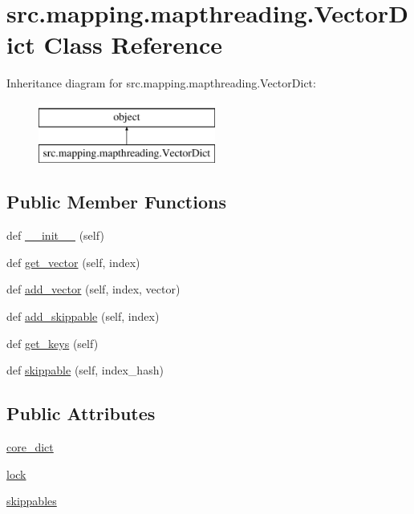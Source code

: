 \hypertarget{classsrc_1_1mapping_1_1mapthreading_1_1_vector_dict}{}\section{src.\+mapping.\+mapthreading.\+Vector\+Dict Class Reference}
\label{classsrc_1_1mapping_1_1mapthreading_1_1_vector_dict}
Inheritance diagram for src.\+mapping.\+mapthreading.\+Vector\+Dict\+:\begin{figure}[H]
\begin{center}
\leavevmode
\includegraphics[height=2.000000cm]{classsrc_1_1mapping_1_1mapthreading_1_1_vector_dict}
\end{center}
\end{figure}
\subsection*{Public Member Functions}
\begin{DoxyCompactItemize}
\item 
def \hyperlink{classsrc_1_1mapping_1_1mapthreading_1_1_vector_dict_a327fffd77dee4ed0d26e912acf1c6ff1}{\+\_\+\+\_\+init\+\_\+\+\_\+} (self)
\item 
def \hyperlink{classsrc_1_1mapping_1_1mapthreading_1_1_vector_dict_a0deaf97f89e5be6de28191a387dd1fd3}{get\+\_\+vector} (self, index)
\item 
def \hyperlink{classsrc_1_1mapping_1_1mapthreading_1_1_vector_dict_a117a9d830431bdd71fe6fcb426f30f9d}{add\+\_\+vector} (self, index, vector)
\item 
def \hyperlink{classsrc_1_1mapping_1_1mapthreading_1_1_vector_dict_aebca32a6845dbfd9162e29e31bd7e506}{add\+\_\+skippable} (self, index)
\item 
def \hyperlink{classsrc_1_1mapping_1_1mapthreading_1_1_vector_dict_a3bab8d126803065aa768519341ab54e2}{get\+\_\+keys} (self)
\item 
def \hyperlink{classsrc_1_1mapping_1_1mapthreading_1_1_vector_dict_a2099b39b18452554de35416ea569ee2e}{skippable} (self, index\+\_\+hash)
\end{DoxyCompactItemize}
\subsection*{Public Attributes}
\begin{DoxyCompactItemize}
\item 
\hyperlink{classsrc_1_1mapping_1_1mapthreading_1_1_vector_dict_a3541d1410985f5b531d7f6c7f67cf2d1}{core\+\_\+dict}
\item 
\hyperlink{classsrc_1_1mapping_1_1mapthreading_1_1_vector_dict_a3ae6f68fd91c50673ace06d486234bfe}{lock}
\item 
\hyperlink{classsrc_1_1mapping_1_1mapthreading_1_1_vector_dict_a6f71fefdbf2c8c31e99190ddd408f558}{skippables}
\end{DoxyCompactItemize}


